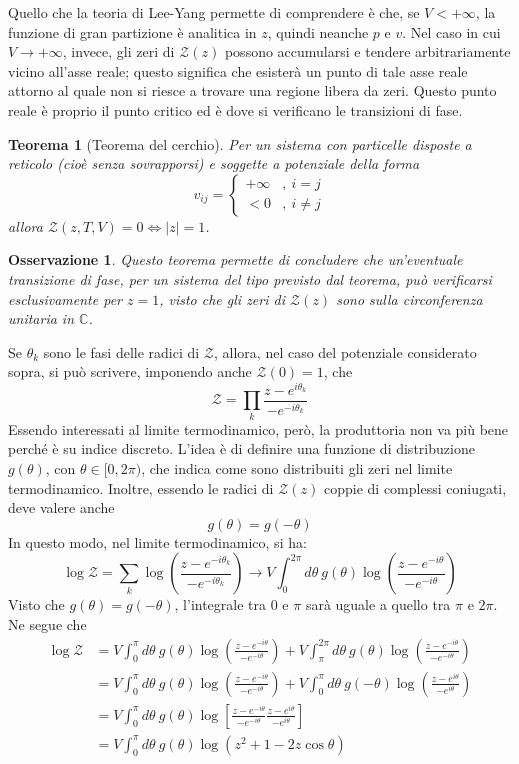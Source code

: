 \documentclass[11pt, a4paper]{scrartcl}
\theoremstyle{style}
\newtheorem{teorema}{Teorema}[section]
\newtheorem{osservazione}{Osservazione}[section]
\theoremstyle{style1}
\numberwithin{equation}{subsection}
\begin{document}
Quello che la teoria di Lee-Yang permette di comprendere \`e che, se $V<+\infty$, la funzione di gran partizione \`e analitica in $z$, quindi neanche $p$ e $v$.
Nel caso in cui $V\to +\infty$, invece, gli zeri di $\mathcal{Z} (z)$ possono accumularsi e tendere arbitrariamente vicino all'asse reale; questo significa che esister\`a un punto di tale asse reale attorno al quale non si riesce a trovare una regione libera da zeri.
Questo punto reale \`e proprio il punto critico ed \`e dove si verificano le transizioni di fase.
\begin{teorema}
	[Teorema del cerchio]
	Per un sistema con particelle disposte a reticolo (cio\`e senza sovrapporsi) e soggette a potenziale della forma 
	\[
	v_{ij} = \begin{cases}
		+\infty &,\ i=j\\
		<0 &,\ i\neq j
	\end{cases}
	\] 
	allora $\mathcal{Z} (z,T,V) = 0 \iff \lvert z \rvert =1$.
\end{teorema}
\begin{osservazione}
Questo teorema permette di concludere che un'eventuale transizione di fase, per un sistema del tipo previsto dal teorema, pu\`o verificarsi esclusivamente per $z=1$, visto che gli zeri di $\mathcal{Z} (z)$ sono sulla circonferenza unitaria in $\mathbb{C}$.
\end{osservazione}
\noindent Se $\theta _k$ sono le fasi delle radici di $\mathcal{Z} $, allora, nel caso del potenziale considerato sopra, si pu\`o scrivere, imponendo anche $\mathcal{Z} (0) = 1$, che
\[
\mathcal{Z}  = \prod_k \frac{z-e^{i\theta _k}}{- e ^{-i\theta _k}}
\] 
Essendo interessati al limite termodinamico, per\`o, la produttoria non va pi\`u bene perch\'e \`e su indice discreto.
L'idea \`e di definire una funzione di distribuzione $g(\theta )$, con $\theta \in [0,2\pi)$, che indica come sono distribuiti gli zeri nel limite termodinamico.
Inoltre, essendo le radici di $\mathcal{Z} (z)$ coppie di complessi coniugati, deve valere anche
\[
g(\theta ) = g(-\theta )
\] 
In questo modo, nel limite termodinamico, si ha:
\[
\log\mathcal{Z} =\sum_{k}^{} \log \left(\frac{z-e^{-i\theta _k}}{-e ^{-i\theta _k}}\right) \longrightarrow V \int_{0} ^{2\pi} d\theta  \ g(\theta ) \log\left(\frac{z- e^{-i\theta }}{-e^{-i\theta }}\right) 
\] 
Visto che $g(\theta )=g(-\theta )$, l'integrale tra $0$ e $\pi$ sar\`a uguale a quello tra $\pi$ e $2\pi$.
Ne segue che
\[
	\begin{split}
		\log \mathcal{Z}  &= V \int_{0} ^{\pi} d\theta \ g(\theta ) \log \left(\frac{z-e^{-i\theta }}{-e^{-i\theta }}\right) + V \int_{\pi}^{2\pi} d\theta \ g(\theta ) \log \left(\frac{z-e^{-i\theta}}{-e^{-i\theta }}\right)  \\
				  &= V \int_{0} ^{\pi} d\theta \ g(\theta ) \log \left(\frac{z-e^{-i\theta }}{-e^{-i\theta }}\right) + V \int_{0}^{\pi} d\theta \ g(-\theta ) \log \left(\frac{z-e^{i\theta}}{-e^{i\theta }}\right) \\
				  &=V \int_{0} ^\pi d\theta \ g(\theta ) \log \left[ \frac{z-e^{-i\theta }}{-e^{-i\theta }} \frac{z- e^{i\theta }}{- e^{i\theta }} \right] \\
				  &= V \int_{0} ^\pi d\theta  \ g(\theta ) \log\left(z^2 + 1 - 2z \cos \theta \right) 
	\end{split}
\] 
\end{document}
